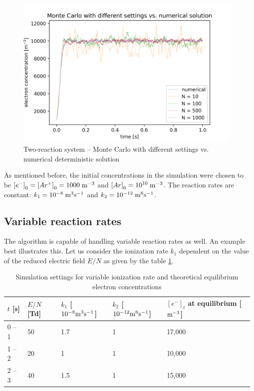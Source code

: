 \begin{figure}
    \centering
    \includegraphics[width=\textwidth]{grafy/2reaction_differentN.png}
    \caption{Two-reaction system -- Monte Carlo with different settings vs. numerical deterministic solution}
    \label{fig:2reactionBasic}
\end{figure}

As mentioned before, the initial concentrations in the simulation were chosen to be $\left[e^{-}\right]_0 = \left[Ar^{+}\right]_0 = 1000\;\rm m^{-3}$ and $\left[Ar\right]_0 = 10^{10}\;\rm m^{-3}$. The reaction rates are constant: $k_1 = 10^{-8} \;\rm m^{3} \rm s^{-1}$ and $k_2 = 10^{-12} \;\rm m^{6} \rm s^{-1}$. 

\subsection{Variable reaction rates}

The algorithm is capable of handling variable reaction rates as well. An example best illustrates this. Let us consider the ionization rate $k_1$ dependent on the value of the reduced electric field $E/N$ as given by the table \ref{tab:ENramp}.

\begin{table}[]
\begin{tabular}{@{}lllll@{}}
\toprule
$t$ [s] & $E/N$ [Td] & $k_1$ [$10^{-8} \rm m^{3} \rm s^{-1}$] & $k_2$ [$10^{-12} \rm m^{6} \rm s^{-1}$] & $\left[ e^{-} \right]_t$ at equilibrium [$\rm m^{-3}$] \\ \midrule
0 -- 1  & 50         & 1.7                                    & 1                                       & 17,000                                                 \\
1 -- 2  & 20         & 1                                      & 1                                       & 10,000                                                 \\
2 -- 3  & 40         & 1.5                                    & 1                                       & 15,000                                                 \\ \bottomrule
\end{tabular}
\caption{Simulation settings for variable ionization rate and theoretical equilibrium electron concentrations}
\label{tab:ENramp}
\end{table}


